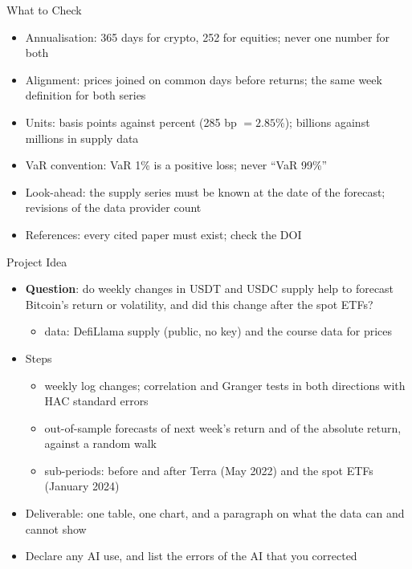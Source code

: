 \begin{frame}{What to Check}
\itemsize{\small}
\begin{itemize}
    \item Annualisation: 365 days for crypto, 252 for equities; never one number for both
    \item Alignment: prices joined on common days before returns; the same week definition for both series
    \item Units: basis points against percent (285 bp $= 2.85\%$); billions against millions in supply data
    \item VaR convention: VaR 1\% is a positive loss; never ``VaR 99\%''
    \item Look-ahead: the supply series must be known at the date of the forecast; revisions of the data provider count
    \item References: every cited paper must exist; check the DOI
\end{itemize}
\end{frame}

\begin{frame}{Project Idea}
\itemsize{\small}
\begin{itemize}
    \item \textbf{Question}: do weekly changes in USDT and USDC supply help to forecast Bitcoin's return or volatility, and did this change after the spot ETFs?
    \begin{itemize}
        \item data: DefiLlama supply (public, no key) and the course data for prices
    \end{itemize}
    \item Steps
    \begin{itemize}
        \item weekly log changes; correlation and Granger tests in both directions with HAC standard errors
        \item out-of-sample forecasts of next week's return and of the absolute return, against a random walk
        \item sub-periods: before and after Terra (May 2022) and the spot ETFs (January 2024)
    \end{itemize}
    \item Deliverable: one table, one chart, and a paragraph on what the data can and cannot show
    \item Declare any AI use, and list the errors of the AI that you corrected
\end{itemize}
\end{frame}


